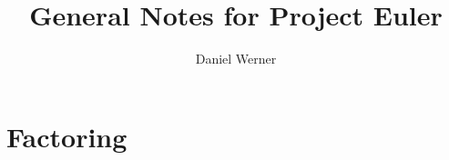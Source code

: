 \documentclass{article}
\title{General Notes for Project Euler}
\author{Daniel Werner}
\begin{document}
\maketitle

\section*{Factoring}
\end{document}
